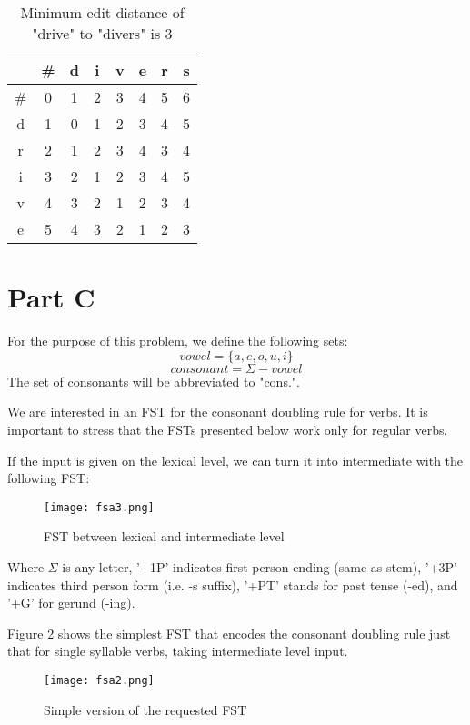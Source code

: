 \documentclass[11pt,journal]{article}
\begin{document}
	\begin{table}[h]
		\centering
		\begin{tabular}{c|c c c c c c c}
			& \# & d & i & v & e & r & s \\
			\hline
			\# & 0 & 1 & 2 & 3 & 4 & 5 & 6\\
			 d & 1 & 0 & 1 & 2 & 3 & 4 & 5\\
			 r & 2 & 1 & 2 & 3 & 4 & 3 & 4\\
			 i & 3 & 2 & 1 & 2 & 3 & 4 & 5\\
			 v & 4 & 3 & 2 & 1 & 2 & 3 & 4\\
			 e & 5 & 4 & 3 & 2 & 1 & 2 & 3\\
			
		\end{tabular}
		\caption{Minimum edit distance of "drive" to "divers" is 3}
	\end{table}
\pagebreak
	\section{Part C}
	
	For the purpose of this problem, we define the following sets:
	\[vowel = \{a,e,o,u,i\}\]
	\[consonant = \Sigma - vowel\]
	The set of consonants will be abbreviated to "cons.".
	
	We are interested in an FST for the consonant doubling rule for verbs. It is important to stress that the FSTs presented below work only for regular verbs. 
	
	If the input is given on the lexical level, we can turn it into intermediate with the following FST:
	
	\begin{figure}[h]
		\centering
		\texttt{[image: fsa3.png]}
		\caption{FST between lexical and intermediate level}
	\end{figure}

	Where $\Sigma$ is any letter, '+1P' indicates first person ending (same as stem), '+3P' indicates third person form (i.e. -s suffix), '+PT' stands for past tense (-ed), and '+G' for gerund (-ing).
	
	
	Figure 2 shows the simplest FST that encodes the consonant doubling rule just that for single syllable verbs, taking intermediate level input.  
	
	\begin{figure}[h]
		\texttt{[image: fsa2.png]}
		\caption{Simple version of the requested FST}
	\end{figure}
\end{document}
